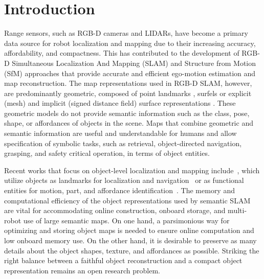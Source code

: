 \section{Introduction}
\label{sec:introduction}

Range sensors, such as RGB-D cameras and LIDARs, have become a primary data source for robot localization and mapping due to their increasing accuracy, affordability, and compactness. This has contributed to the development of RGB-D Simultaneous Localization And Mapping (SLAM) \cite{kerl2013dense, newcombe2011kinectfusion, palazzolo2019refusion, wang2019real} and Structure from Motion (SfM) \cite{agarwal2011building, crandall2011discrete, schonberger2016structure} approaches that provide accurate and efficient ego-motion estimation and map reconstruction. The map representations used in RGB-D SLAM, however, are predominantly geometric, composed of point landmarks \cite{kerl2013dense, sunderhauf2017meaningful}, surfels \cite{whelan2016elasticfusion} or explicit (mesh) and implicit (signed distance field) surface representations \cite{newcombe2011kinectfusion, rosinol2019kimera}. These geometric models do not provide semantic information such as the class, pose, shape, or affordances of objects in the scene. Maps that combine geometric and semantic information are useful and understandable for humans and allow specification of symbolic tasks, such as retrieval, object-directed navigation, grasping, and safety critical operation, in terms of object entities.

Recent works that focus on object-level localization and mapping include~\cite{pronobis2011semantic,salas2013slam++, mu2016slam, sunderhauf2017meaningful, mccormac2018fusion++, hu2019deep}, which utilize objects as landmarks for localization and navigation~\cite{salas2013slam++, Atanasov_SemanticLocalization_IJRR15, mu2016slam, sunderhauf2017meaningful, mccormac2018fusion++, hu2019deep} or as functional entities for motion, part, and affordance identification~\cite{lu2018beyond, qiu2019tracking, mo2019partnet, Luo_2020_ICLR}. The memory and computational efficiency of the object representations used by semantic SLAM are vital for accommodating online construction, onboard storage, and multi-robot use of large semantic maps. On one hand, a parsimonious way for optimizing and storing object maps is needed to ensure online computation and low onboard memory use. On the other hand, it is desirable to preserve as many details about the object shapes, texture, and affordances as possible. Striking the right balance between a faithful object reconstruction and a compact object representation remains an open research problem.

